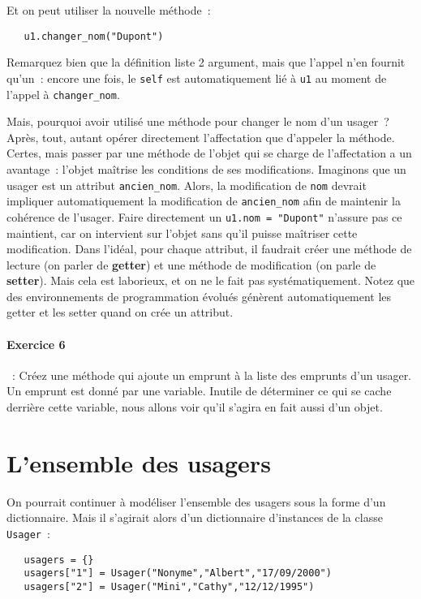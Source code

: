 \documentclass{article}
\begin{document}
Et on peut utiliser la nouvelle méthode~:

\begin{verbatim}
   u1.changer_nom("Dupont")
\end{verbatim}

Remarquez bien que la définition liste 2 argument, mais que l'appel n'en fournit qu'un~: encore une fois, le \texttt{self} est automatiquement lié à \texttt{u1} au moment de l'appel à \texttt{changer\_nom}.

Mais, pourquoi avoir utilisé une méthode pour changer le nom d'un usager~? Après, tout, autant opérer directement l'affectation que d'appeler la méthode. Certes, mais passer par une méthode de l'objet qui se charge de l'affectation a un avantage~: l'objet maîtrise les conditions de ses modifications. Imaginons que un usager est un attribut \texttt{ancien\_nom}. Alors, la modification de \texttt{nom} devrait impliquer automatiquement la modification de \texttt{ancien\_nom} afin de maintenir la cohérence de l'usager. Faire directement un \texttt{u1.nom = "Dupont"} n'assure pas ce maintient, car on intervient sur l'objet sans qu'il puisse maîtriser cette modification. Dans l'idéal, pour chaque attribut, il faudrait créer une méthode de lecture (on parler de \textbf{getter}) et une méthode de modification (on parle de \textbf{setter}). Mais cela est laborieux, et on ne le fait pas systématiquement. Notez que des environnements de programmation évolués génèrent automatiquement les getter et les setter quand on crée un attribut.

\paragraph{Exercice 6}~: Créez une méthode qui ajoute un emprunt à la liste des emprunts d'un usager. Un emprunt est donné par une variable. Inutile de déterminer ce qui se cache derrière cette variable, nous allons voir qu'il s'agira en fait aussi d'un objet.

\section{L'ensemble des usagers}

On pourrait continuer à modéliser l'ensemble des usagers sous la forme d'un dictionnaire. Mais il s'agirait alors d'un dictionnaire d'instances de la classe \texttt{Usager}~:

\begin{verbatim}
   usagers = {}
   usagers["1"] = Usager("Nonyme","Albert","17/09/2000")
   usagers["2"] = Usager("Mini","Cathy","12/12/1995")
\end{verbatim}
\end{document}
